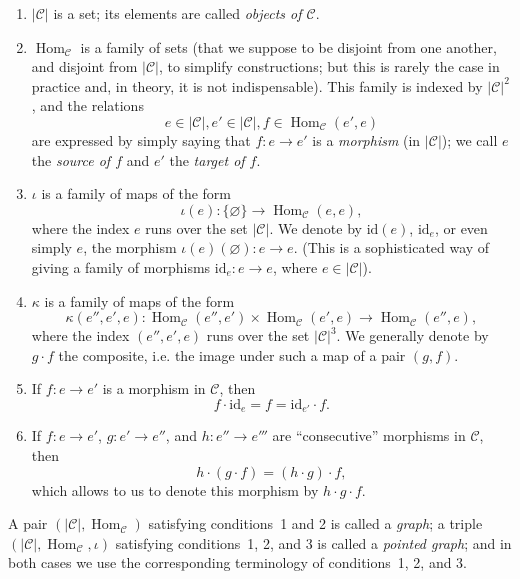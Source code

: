\documentclass{article}
\newcommand{\oldpage}[1]{\marginpar{\footnotesize$\Big\vert$ \textit{p.~#1}}}
\newcommand{\cat}[1]{\mathcal{#1}}
\newcommand{\set}[1]{|#1|}
\newcommand{\id}{\mathrm{id}}
\DeclareMathOperator{\Hom}{Hom}
\begin{document}
\begin{enumerate}
  \item $\set{\cat{C}}$ is a set; its elements are called \emph{objects of $\cat{C}$}.

  \item $\Hom_\cat{C}$ is a family of sets (that we suppose to be disjoint from one another, and disjoint from $\set{\cat{C}}$, to simplify constructions; but this is rarely the case in practice and, in theory, it is not indispensable).
    This family is indexed by $\set{\cat{C}}^2$, and the relations
    \[
      e\in\set{\cat{C}},
      e'\in\set{\cat{C}},
      f\in\Hom_\cat{C}(e',e)
    \]
    are expressed by simply saying that $f\colon e\to e'$ is a \emph{morphism} (in $\set{\cat{C}}$);
    we call $e$ the \emph{source of $f$} and $e'$ the \emph{target of $f$}.

  \item $\iota$ is a family of maps of the form
    \[
      \iota(e)\colon \{\varnothing\}
      \to \Hom_\cat{C}(e,e),
    \]
    where the index $e$ runs over the set $\set{\cat{C}}$.
    We denote by $\id(e)$, $\id_e$, or even simply $e$, the morphism $\iota(e)(\varnothing)\colon e\to e$.
    \oldpage{220}
    (This is a sophisticated way of giving a family of morphisms $\id_e\colon e\to e$, where $e\in\set{\cat{C}}$).

  \item $\kappa$ is a family of maps of the form
    \[
      \kappa(e'',e',e)\colon
      \Hom_\cat{C}(e'',e')\times\Hom_\cat{C}(e',e)
      \to \Hom_\cat{C}(e'',e),
    \]
    where the index $(e'',e',e)$ runs over the set $\set{\cat{C}}^3$.
    We generally denote by $g\cdot f$ the composite, i.e. the image under such a map of a pair $(g,f)$.

  \item If $f\colon e\to e'$ is a morphism in $\cat{C}$, then
    \[
      f\cdot\id_e
      = f
      = \id_{e'}\cdot f.
    \]

  \item If $f\colon e\to e'$, $g\colon e'\to e''$, and $h\colon e''\to e'''$ are ``consecutive'' morphisms in $\cat{C}$, then
    \[
      h\cdot(g\cdot f)
      = (h\cdot g)\cdot f,
    \]
    which allows to us to denote this morphism by $h\cdot g\cdot f$.
\end{enumerate}

A pair $(\set{\cat{C}},\Hom_\cat{C})$ satisfying conditions~1 and 2 is called a \emph{graph}; a triple $(\set{\cat{C}},\Hom_\cat{C},\iota)$ satisfying conditions~1, 2, and 3 is called a \emph{pointed graph}; and in both cases we use the corresponding terminology of conditions~1, 2, and 3.
\end{document}
